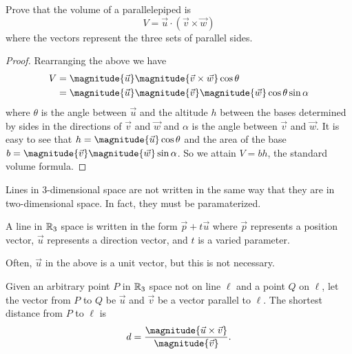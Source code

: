 \documentclass[11pt]{scrartcl}
\begin{document}
\begin{example}
    Prove that the volume of a parallelepiped is
    \[V = \vec{u} \cdot (\vec{v} \times \vec{w})\]
    where the vectors represent the three sets of parallel sides.

    \begin{proof}
        Rearranging the above we have
        \begin{align*}
            V &= \magnitude{\vec{u}} \magnitude{\vec{v} \times \vec{w}} \cos\theta \\
            &= \magnitude{\vec{u}} \magnitude{\vec{v}} \magnitude{\vec{w}} \cos\theta \sin\alpha
        \end{align*}
        where $\theta$ is the angle between $\vec{u}$ and the altitude $h$ between the bases determined by sides in the directions of $\vec{v}$ and $\vec{w}$ and $\alpha$ is the angle between $\vec{v}$ and $\vec{w}$. It is easy to see that $h = \magnitude{\vec{u}}\cos\theta$ and the area of the base $b = \magnitude{\vec{v}} \magnitude{\vec{w}} \sin\alpha$. So we attain $V = bh$, the standard volume formula.
    \end{proof}
\end{example}

Lines in 3-dimensional space are not written in the same way that they are in two-dimensional space. In fact, they must be paramaterized.

\begin{definition}
    A line in $\mathbb R_{3}$ space is written in the form $\vec{p} + t\vec{u}$ where $\vec{p}$ represents a position vector, $\vec{u}$ represents a direction vector, and $t$ is a varied parameter.
\end{definition}

\begin{remark}
    Often, $\vec{u}$ in the above is a unit vector, but this is not necessary.
\end{remark}

\begin{theorem}
    Given an arbitrary point $P$ in $\mathbb R_{3}$ space not on line $\ell$ and a point $Q$ on $\ell$, let the vector from $P$ to $Q$ be $\vec{u}$ and $\vec{v}$ be a vector parallel to $\ell$. The shortest distance from $P$ to $\ell$ is
    \[d = \frac{\magnitude{\vec{u} \times \vec{v}}}{\magnitude{\vec{v}}}.\]
\end{theorem}
\end{document}
